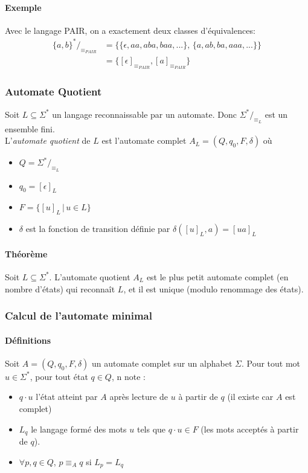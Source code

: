 \documentclass[a4paper]{article}
\begin{document}
  \paragraph{Exemple} Avec le langage PAIR, on a exactement deux classes d'équivalences:
  \begin{align*}
    \{a,b\}^*/_{\equiv_{PAIR}} & = \{ \{\epsilon, aa, aba, baa,...\},\, \{a, ab, ba, aaa,...\} \}\\
    & = \{[\epsilon]_{\equiv_{PAIR}}, [a]_{\equiv_{PAIR}}\}
  \end{align*}

  \subsubsection{Automate Quotient}
  Soit $L \subseteq \Sigma^*$ un langage reconnaissable par un automate. 
  Donc $\Sigma^*/_{\equiv_L}$ est un ensemble fini.\\

  L'\textit{automate quotient} de $L$ est l'automate complet $A_L = (Q, q_0, F, \delta)$ où
  \begin{itemize}
    \item $Q = \Sigma^*/_{\equiv_L}$
    \item $q_0 = [\epsilon]_L$
    \item $F = \{ [u]_L\, |\, u \in L \}$
    \item $\delta$ est la fonction de transition définie par $\delta([u]_L, a) = [ua]_L$
  \end{itemize}

  \paragraph{Théorème} Soit $L \subseteq \Sigma^*$. L'automate quotient $A_L$ est
  le plus petit automate complet (en nombre d'états) qui reconnaît $L$, et il est 
  unique (modulo renommage des états).

  \subsubsection{Calcul de l'automate minimal}
  \paragraph{Définitions}
  Soit $A = (Q, q_0, F, \delta)$ un automate complet sur un alphabet $\Sigma$. 
  Pour tout mot $u \in \Sigma^*$, pour tout état $q \in Q$, n note :
  \begin{itemize}
    \item $q \cdot u$ l'état atteint par $A$ après lecture de $u$ à partir de $q$
    (il existe car $A$ est complet)
    \item $L_q$ le langage formé des mots $u$ tels que $q\cdot u \in F$ (les mots
    acceptés à partir de $q$).
    \item $\forall p,q\in Q$, $p \equiv_A q$ si $L_p = L_q$
  \end{itemize}
\end{document}
